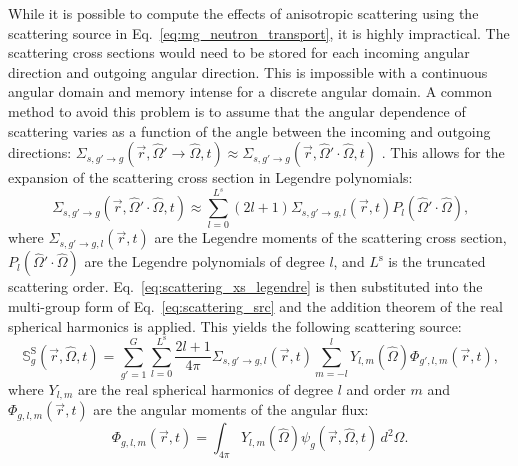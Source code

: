 While it is possible to compute the effects of anisotropic scattering using the scattering source in Eq.~\ref{eq:mg_neutron_transport}, it is highly impractical. The scattering cross sections would need to be stored for each incoming angular direction and outgoing angular direction. This is impossible with a continuous angular domain and memory intense for a discrete angular domain. A common method to avoid this problem is to assume that the angular dependence of scattering varies as a function of the angle between the incoming and outgoing directions: $\Sigma_{s, g'\rightarrow g}(\vec{r}, \hat{\Omega}' \rightarrow \hat{\Omega}, t) \approx \Sigma_{s, g'\rightarrow g}(\vec{r}, \hat{\Omega}'\cdot \hat{\Omega}, t)$ \cite{applied_reactor_physics}. This allows for the expansion of the scattering cross section in Legendre polynomials:
\begin{equation}\label{eq:scattering_xs_legendre}
    \Sigma_{s, g'\rightarrow g}(\vec{r}, \hat{\Omega}'\cdot\hat{\Omega}, t) \approx \sum_{l = 0}^{L^{s}}(2l + 1)\Sigma_{s, g'\rightarrow g,l}(\vec{r}, t)P_{l}(\hat{\Omega}'\cdot\hat{\Omega})\text{,}
\end{equation}
where $\Sigma_{s, g'\rightarrow g,l}(\vec{r}, t)$ are the Legendre moments of the scattering cross section, $P_{l}(\hat{\Omega}'\cdot\hat{\Omega})$ are the Legendre polynomials of degree $l$, and $L^{\text{s}}$ is the truncated scattering order. Eq.~\ref{eq:scattering_xs_legendre} is then substituted into the multi-group form of Eq.~\ref{eq:scattering_src} and the addition theorem of the real spherical harmonics is applied. This yields the following scattering source:
\begin{equation}\label{eq:mg_sh_scattering_source}
    \mathbb{S}^{\text{S}}_{g}(\vec{r}, \hat{\Omega}, t) = \sum_{g' = 1}^{G}\sum_{l = 0}^{L^{\text{s}}}\frac{2l + 1}{4\pi}\Sigma_{s, g'\rightarrow g, l}(\vec{r}, t)\sum_{m = -l}^{l} Y_{l,m}(\hat{\Omega})\Phi_{g', l, m}(\vec{r}, t)\text{,}
\end{equation}
where $Y_{l,m}$ are the real spherical harmonics of degree $l$ and order $m$ and $\Phi_{g,l,m}(\vec{r}, t)$ are the angular moments of the angular flux:
\begin{equation}\label{eq:mg_flux_angle_moments}
    \Phi_{g,l,m}(\vec{r}, t) = \int_{4\pi}Y_{l,m}(\hat{\Omega})\psi_{g}(\vec{r}, \hat{\Omega}, t)\, d^{2}\Omega\text{.}
\end{equation}

